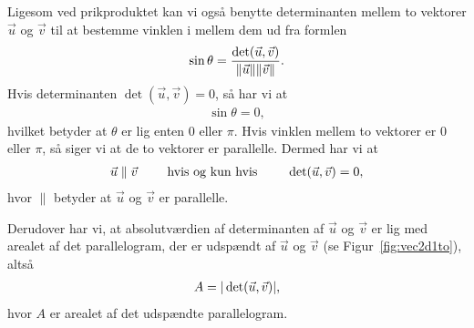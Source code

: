 Ligesom ved prikproduktet kan vi også benytte determinanten mellem to vektorer $\vec{u}$ og $\vec{v}$ til at bestemme vinklen i mellem dem ud fra formlen
\begin{align}\label{eq:vec2d1vinkelveddeterminant}
\sin \theta = \frac{\det(\vec{u},\vec{v})}{\Vert \vec{u}\Vert\Vert \vec{v}\Vert}.
\end{align}
Hvis determinanten $\det(\vec{u}, \vec{v})=0$, så har vi at 
\begin{align*}
\sin \theta = 0,
\end{align*}
hvilket betyder at $\theta$ er lig enten $0$ eller $\pi$. Hvis vinklen mellem to vektorer er $0$ eller $\pi$, så siger vi at de to vektorer er parallelle. Dermed har vi at 
\begin{align*}
\vec{u} \parallel \vec{v} \qquad \textup{ hvis og kun hvis } \qquad \det(\vec{u}, \vec{v}) = 0,
\end{align*}
hvor $\parallel$ betyder at $\vec{u}$ og $\vec{v}$ er parallelle.

Derudover har vi, at absolutværdien af determinanten af $\vec{u}$ og $\vec{v}$ er lig med arealet af det parallelogram, der er udspændt af $\vec{u}$ og $\vec{v}$ (se Figur~\ref{fig:vec2d1to}), altså
\begin{align*}
A = \vert \det( \vec{u},\vec{v} )\vert,
\end{align*}
hvor $A$ er arealet af det udspændte parallelogram.

